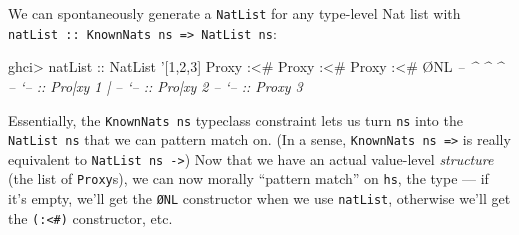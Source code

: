 \documentclass[]{article}
\newenvironment{Shaded}{}{}
\newcommand{\KeywordTok}[1]{\textcolor[rgb]{0.00,0.44,0.13}{\textbf{{#1}}}}
\newcommand{\DataTypeTok}[1]{\textcolor[rgb]{0.56,0.13,0.00}{{#1}}}
\newcommand{\CharTok}[1]{\textcolor[rgb]{0.25,0.44,0.63}{{#1}}}
\newcommand{\CommentTok}[1]{\textcolor[rgb]{0.38,0.63,0.69}{\textit{{#1}}}}
\newcommand{\OtherTok}[1]{\textcolor[rgb]{0.00,0.44,0.13}{{#1}}}
\newcommand{\FunctionTok}[1]{\textcolor[rgb]{0.02,0.16,0.49}{{#1}}}
\newcommand{\NormalTok}[1]{{#1}}
\begin{document}
We can spontaneously generate a \texttt{NatList} for any type-level Nat
list with
\texttt{natList\ ::\ KnownNats\ ns\ =\textgreater{}\ NatList\ ns}:

\begin{Shaded}
\begin{Highlighting}[]
\NormalTok{ghci}\FunctionTok{>}\OtherTok{ natList ::} \DataTypeTok{NatList} \CharTok{'[1,2,3]}
\DataTypeTok{Proxy} \FunctionTok{:<#} \DataTypeTok{Proxy} \FunctionTok{:<#} \DataTypeTok{Proxy} \FunctionTok{:<#} \NormalTok{Ø}\DataTypeTok{NL}
\CommentTok{-- ^         ^         ^}
\CommentTok{-- `-- :: Pro|xy 1     |}
\CommentTok{--           `-- :: Pro|xy 2}
\CommentTok{--                     `-- :: Proxy 3}
\end{Highlighting}
\end{Shaded}

Essentially, the \texttt{KnownNats\ ns} typeclass constraint lets us
turn \texttt{ns} into the \texttt{NatList\ ns} that we can pattern match
on. (In a sense, \texttt{KnownNats\ ns\ =\textgreater{}} is really
equivalent to \texttt{NatList\ ns\ -\textgreater{}}) Now that we have an
actual value-level \emph{structure} (the list of \texttt{Proxy}s), we
can now morally ``pattern match'' on \texttt{hs}, the type --- if it's
empty, we'll get the \texttt{ØNL} constructor when we use
\texttt{natList}, otherwise we'll get the \texttt{(:\textless{}\#)}
constructor, etc.

\begin{Shaded}
\end{Shaded}
\end{document}
